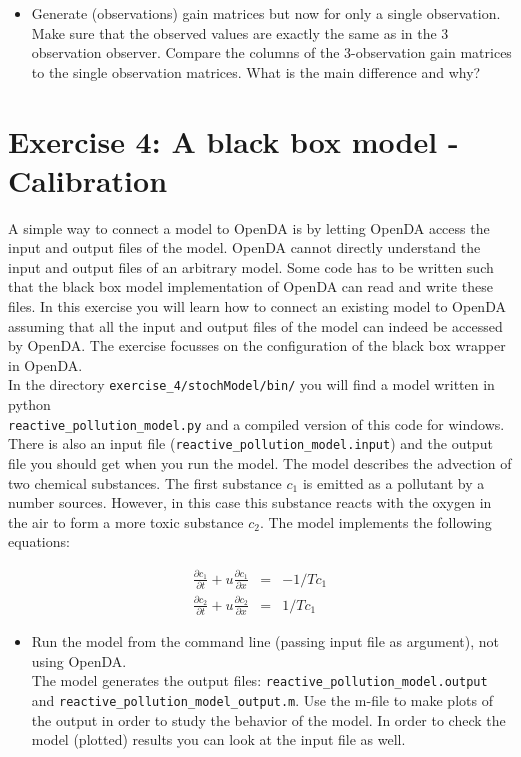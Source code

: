 \documentclass[a4paper,10pt]{article}
\begin{document}
\begin{itemize}
\item Generate (observations) gain matrices but now for only a single
  observation. Make sure that the observed values are exactly the same as in
  the 3 observation observer. Compare the columns of the 3-observation gain
  matrices to the single observation matrices. What is the main difference and
  why?
\end{itemize}

\section{Exercise 4: A black box model - Calibration}

A simple way to connect a model to OpenDA is by letting OpenDA access the input
and output files of the model. OpenDA cannot directly understand the input and
output files of an arbitrary model. Some code has to be written such that the
black box model implementation of OpenDA can read and write these files. In
this exercise you will learn how to connect an existing model to OpenDA
assuming that all the input and output files of the model can indeed be
accessed by OpenDA. The exercise focusses on the configuration of the black box
wrapper in OpenDA.\\

In the directory {\tt exercise\_4/stochModel/bin/} you will find a model written in python \\
{\tt reactive\_pollution\_model.py} and a compiled version of this code for
windows. There is also an input file ({\tt reactive\_pollution\_model.input})
and the output file you should get when you run the model. The model describes
the advection of two chemical substances. The first substance $c_1$ is emitted
as a pollutant by a number sources. However, in this case this substance reacts
with the oxygen in the air to form a more toxic substance $c_2$. The model
implements the following equations:

\begin{eqnarray}
    \frac{\partial c_1}{\partial t} + u\frac{\partial c_1}{\partial x} & = & -
    1/T c_1 \\
    \frac{\partial c_2}{\partial t} + u\frac{\partial c_2}{\partial x} & = &
    1/T c_1
\end{eqnarray}

\begin{itemize}
\item Run the model from the command line (passing input file as argument),
not using OpenDA.\\
The model
  generates the output files: {\tt reactive\_pollution\_model.output} and
  {\tt reactive\_pollution\_model\_output.m}. Use the m-file to make plots
  of the output in order to study the behavior of the model. In order to check
  the model (plotted) results you can look at the input file as well.
\end{itemize}
\end{document}
